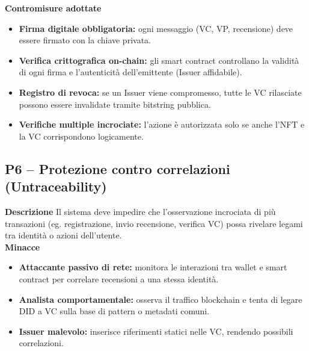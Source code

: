             \noindent \textbf{Contromisure adottate}
                \begin{itemize}
                    \item \textbf{Firma digitale obbligatoria:} ogni messaggio (VC, VP, recensione) deve essere firmato con la chiave privata.

                    \item \textbf{Verifica crittografica on-chain:} gli smart contract controllano la validità di ogni firma e l'autenticità dell'emittente (Issuer affidabile).

                    \item \textbf{Registro di revoca:} se un Issuer viene compromesso, tutte le VC rilasciate possono essere invalidate tramite bitstring pubblica.

                    \item \textbf{Verifiche multiple incrociate:} l'azione è autorizzata solo se anche l’NFT e la VC corrispondono logicamente.
                \end{itemize}

        \subsection{P6 – Protezione contro correlazioni (Untraceability)}
            \noindent \textbf{Descrizione}
                Il sistema deve impedire che l'osservazione incrociata di più transazioni (eg. registrazione, invio recensione, verifica VC) possa rivelare legami tra identità o azioni dell'utente. \\

            \noindent \textbf{Minacce}
                \begin{itemize}
                    \item \textbf{Attaccante passivo di rete:} monitora le interazioni tra wallet e smart contract per correlare recensioni a una stessa identità.

                    \item \textbf{Analista comportamentale:} osserva il traffico blockchain e tenta di legare DID a VC sulla base di pattern o metadati comuni.

                    \item \textbf{Issuer malevolo:} inserisce riferimenti statici nelle VC, rendendo possibili correlazioni.
                \end{itemize}

